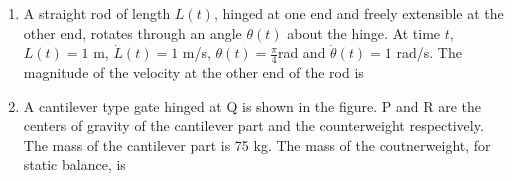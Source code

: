 \documentclass[journal,12pt,onecolumn]{IEEEtran}
\begin{document}
\begin{enumerate}
    \item A straight rod of length $L(t)$, hinged at one end and freely extensible at the other end, rotates through an angle $\theta(t)$ about the hinge. At time $t$, $L(t)=1$ m, $\dot{L}(t)=1$ m/s, $\theta(t)=\frac{\pi}{4}$rad and $\dot{\theta}(t)=1$ rad/s. The magnitude of the velocity at the other end of the rod is
          \begin{enumerate}
          \end{enumerate}

    \item A cantilever type gate hinged at Q is shown in the figure. P and R are the centers of gravity of the cantilever part and the counterweight respectively. The mass of the cantilever part is 75 kg. The mass of the coutnerweight, for static balance, is\\

          \begin{figure}[H]
              \centering
              \caption{}
              \label{q10}
          \end{figure}

          \begin{enumerate}
          \end{enumerate}


\end{enumerate}
\end{document}
